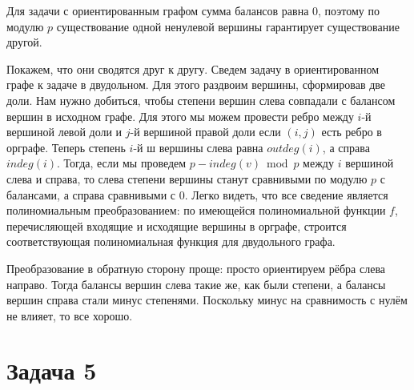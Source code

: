 \documentclass{article}
\theoremstyle{definition}
\theoremstyle{remark}
\begin{document}
Для задачи с ориентированным графом сумма балансов равна 0, поэтому по модулю $p$ существование
одной ненулевой вершины гарантирует существование другой.

Покажем, что они сводятся друг к другу. Сведем задачу в ориентированном графе к задаче в двудольном.
Для этого раздвоим вершины, сформировав две доли. Нам нужно добиться, чтобы степени вершин слева
совпадали с балансом вершин в исходном графе. Для этого мы можем провести ребро между $i$-й вершиной
левой доли и $j$-й вершиной правой доли если $(i, j)$ есть ребро в орграфе. Теперь степень $i$-й ш
вершины слева равна $outdeg(i)$, а справа $indeg(i)$. Тогда, если мы проведем $p - indeg(v) \bmod p$
между $i$ вершиной слева и справа, то слева степени вершины станут сравнивыми по модулю $p$ с
балансами, а справа сравнивыми с 0. Легко видеть, что все сведение является полиномиальным
преобразованием: по имеющейся полиномиальной функции $f$, перечисляющей входящие и исходящие вершины
в орграфе, строится соответствующая полиномиальная функция для двудольного графа.

Преобразование в обратную сторону проще: просто ориентируем рёбра слева направо. Тогда балансы
вершин слева такие же, как были степени, а балансы вершин справа стали минус степенями. Поскольку
минус на сравнимость с нулём не влияет, то все хорошо.

\section*{Задача 5}
\end{document}
